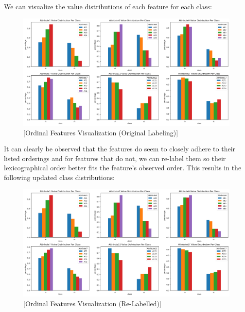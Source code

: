 \documentclass{article}
\begin{document}
    \newpage

    We can visualize the value distributions of each feature for each class:

    \begin{figure}[H]
        \centering
        \includegraphics[width=\textwidth, height=0.35\textheight]{./I_1_g_c.png}
        \caption{[Ordinal Features Visualization (Original Labeling)]}
    \end{figure}

    It can clearly be observed that the features do seem to closely adhere to their listed orderings and for features that do not, we can re-label them so their
    lexicographical order better fits the feature's observed order. This results in the following updated class distributions:

    \begin{figure}[H]
        \centering
        \includegraphics[width=\textwidth, height=0.35\textheight]{./I_1_g_d.png}
        \caption{[Ordinal Features Visualization (Re-Labelled)]}
    \end{figure}
    
    \newpage
\end{document}
